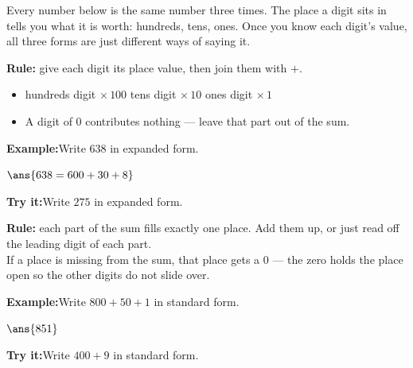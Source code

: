 \documentclass[12pt]{article}
\begin{document}

\noindent\small Every number below is the same number three times. The place a
digit sits in tells you what it is worth: hundreds, tens, ones. Once you know
each digit's value, all three forms are just different ways of saying it.
\normalsize

\begin{formulabox}
\textbf{Rule:} give each digit its place value, then join them with $+$.
\begin{itemize}[leftmargin=1.2cm, itemsep=1pt, topsep=2pt]
  \item hundreds digit $\times\,100$ \quad tens digit $\times\,10$ \quad ones digit $\times\,1$
  \item A digit of $0$ contributes nothing --- leave that part out of the sum.
\end{itemize}
\end{formulabox}
\begin{examplebox}
\textbf{Example:}\quad Write $638$ in expanded form.
\par
$\ans{638 = 600 + 30 + 8}$
\end{examplebox}
\begin{tryitbox}
\textbf{Try it:}\quad Write $275$ in expanded form.\\[2pt]
\end{tryitbox}

\begin{formulabox}
\textbf{Rule:} each part of the sum fills exactly one place. Add them up, or
just read off the leading digit of each part.\\[3pt]
If a place is missing from the sum, that place gets a $0$ --- the zero holds
the place open so the other digits do not slide over.
\end{formulabox}
\begin{examplebox}
\textbf{Example:}\quad Write $800 + 50 + 1$ in standard form.
\par
$\ans{851}$
\end{examplebox}
\begin{tryitbox}
\textbf{Try it:}\quad Write $400 + 9$ in standard form.\\[2pt]
\end{tryitbox}
\end{document}
